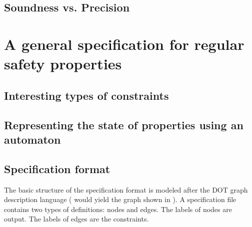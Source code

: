 \section{Soundness vs. Precision}


\chapter{A general specification for regular safety properties}
\section{Interesting types of constraints}

\section{Representing the state of properties using an automaton}

\section{Specification format}
The basic structure of the specification format is modeled after the DOT graph description language ( would yield the graph shown in ).
A specification file contains two types of definitions: nodes and edges. The labels of nodes are output. The labels of edges are the constraints.

